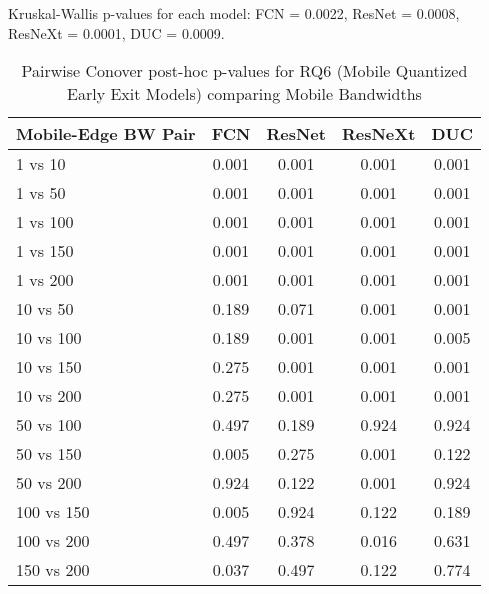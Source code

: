 \begin{table}[h]
\centering
\caption{Pairwise Conover post-hoc p-values for RQ6 (Mobile Quantized Early Exit Models) comparing Mobile Bandwidths}
\label{tab:conover_mobile_quantized_earlyexit}
\smallskip
Kruskal-Wallis p-values for each model: FCN = 0.0022, ResNet = 0.0008, ResNeXt = 0.0001, DUC = 0.0009.

\begin{tabular}{lcccc}
\toprule
Mobile-Edge BW Pair & FCN & ResNet & ResNeXt & DUC \\
\midrule
1 vs 10 & 0.001 & 0.001 & 0.001 & 0.001 \\
1 vs 50 & 0.001 & 0.001 & 0.001 & 0.001 \\
1 vs 100 & 0.001 & 0.001 & 0.001 & 0.001 \\
1 vs 150 & 0.001 & 0.001 & 0.001 & 0.001 \\
1 vs 200 & 0.001 & 0.001 & 0.001 & 0.001 \\
10 vs 50 & 0.189 & 0.071 & 0.001 & 0.001 \\
10 vs 100 & 0.189 & 0.001 & 0.001 & 0.005 \\
10 vs 150 & 0.275 & 0.001 & 0.001 & 0.001 \\
10 vs 200 & 0.275 & 0.001 & 0.001 & 0.001 \\
50 vs 100 & 0.497 & 0.189 & 0.924 & 0.924 \\
50 vs 150 & 0.005 & 0.275 & 0.001 & 0.122 \\
50 vs 200 & 0.924 & 0.122 & 0.001 & 0.924 \\
100 vs 150 & 0.005 & 0.924 & 0.122 & 0.189 \\
100 vs 200 & 0.497 & 0.378 & 0.016 & 0.631 \\
150 vs 200 & 0.037 & 0.497 & 0.122 & 0.774 \\
\bottomrule
\end{tabular}
\end{table}
